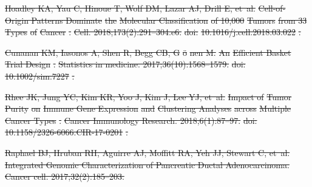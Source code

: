 \documentclass[10pt,letterpaper]{article}
\providecommand{\DIFdeltex}[1]{{\protect\color{red}\sout{#1}}}                      %
\providecommand{\DIFdelend}{} %
\providecommand{\DIFdel}[1]{\texorpdfstring{\DIFdeltex{#1}}{}} %
\DeclareRobustCommand{\DIFdelend}{\DIFOaddend \let\includegraphics\DIFOincludegraphics} %
\begin{document}
\begin{thebibliography}{10}
\DIFdel{Hoadley KA, Yau C, Hinoue T, Wolf DM, Lazar AJ, Drill E, et~al.
	}%
\DIFdel{Cell-of-}%
\DIFdel{Origin Patterns Dominate}%
\DIFdel{the }%
\DIFdel{Molecular Classification}%
\DIFdel{of 10,000 }%
\DIFdel{Tumors}%
\DIFdel{from 33 }%
\DIFdel{Types}%
\DIFdel{of }%
\DIFdel{Cancer}%
\DIFdel{.
	}%
\DIFdel{Cell. 2018;173(2):291--304.e6.
	}%
\DIFdel{doi:}%
\DIFdel{10.1016/j.cell.2018.03.022}%
\DIFdel{.
	}%

\DIFdel{Cunanan KM, Iasonos A, Shen R, Begg CB, G}%
\DIFdel{\"o}%
\DIFdel{nen M.
	}%
\DIFdel{An }%
\DIFdel{Efficient Basket Trial Design}%
\DIFdel{.
	}%
\DIFdel{Statistics in medicine. 2017;36(10):1568--1579.
	}%
\DIFdel{doi:}%
\DIFdel{10.1002/sim.7227}%
\DIFdel{.
	}%

\DIFdel{Rhee JK, Jung YC, Kim KR, Yoo J, Kim J, Lee YJ, et~al.
	}%
\DIFdel{Impact of }%
\DIFdel{Tumor Purity}%
\DIFdel{on }%
\DIFdel{Immune Gene Expression}%
\DIFdel{and
	}%
\DIFdel{Clustering Analyses}%
\DIFdel{across }%
\DIFdel{Multiple Cancer Types}%
\DIFdel{.
	}%
\DIFdel{Cancer Immunology Research. 2018;6(1):87--97.
	}%
\DIFdel{doi:}%
\DIFdel{10.1158/2326-6066.CIR-17-0201}%
\DIFdel{.
	}%

\DIFdel{Raphael BJ, Hruban RH, Aguirre AJ, Moffitt RA, Yeh JJ, Stewart C, et~al.
	}%
\DIFdel{Integrated Genomic Characterization of Pancreatic Ductal
	Adenocarcinoma.
	}%
\DIFdel{Cancer cell. 2017;32(2):185--203.
	}\DIFdelend 

\end{thebibliography}
\end{document}
